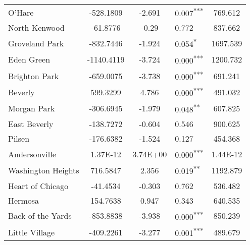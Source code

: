 \documentclass[12pt]{report}
\begin{document}
\begin{longtable}{l S[table-format=6.4] S[table-format=3.4] l S[table-format=4.4]}
	O'Hare                       & -528.1809            & -2.691           & 0.007\textsuperscript{***} & 769.612                           \\
	North Kenwood                & -61.8776             & -0.29            & 0.772                      & 837.662                           \\
	Groveland Park               & -832.7446            & -1.924           & 0.054\textsuperscript{*}   & 1697.539                          \\
	Eden Green                   & -1140.4119           & -3.724           & 0.000\textsuperscript{***} & 1200.732                          \\
	Brighton Park                & -659.0075            & -3.738           & 0.000\textsuperscript{***} & 691.241                           \\
	Beverly                      & 599.3299             & 4.786            & 0.000\textsuperscript{***} & 491.032                           \\
	Morgan Park                  & -306.6945            & -1.979           & 0.048\textsuperscript{**}  & 607.825                           \\
	East Beverly                 & -138.7272            & -0.604           & 0.546                      & 900.625                           \\
	Pilsen                       & -176.6382            & -1.524           & 0.127                      & 454.368                           \\
	Andersonville                & 1.37E-12             & 3.74E+00         & 0.000\textsuperscript{***} & 1.44E-12                          \\
	Washington Heights           & 716.5847             & 2.356            & 0.019\textsuperscript{**}  & 1192.879                          \\
	Heart of Chicago             & -41.4534             & -0.303           & 0.762                      & 536.482                           \\
	Hermosa                      & 154.7638             & 0.947            & 0.343                      & 640.535                           \\
	Back of the Yards            & -853.8838            & -3.938           & 0.000\textsuperscript{***} & 850.239                           \\
	Little Village               & -409.2261            & -3.277           & 0.001\textsuperscript{***} & 489.679                           \\

\end{longtable}
\end{document}
